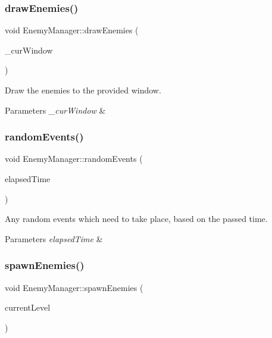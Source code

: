 \subsubsection{\texorpdfstring{draw\+Enemies()}{drawEnemies()}}
{\footnotesize\ttfamily void Enemy\+Manager\+::draw\+Enemies (\begin{DoxyParamCaption}\item[{sf\+::\+Render\+Window $\ast$}]{\+\_\+cur\+Window }\end{DoxyParamCaption})}



Draw the enemies to the provided window. 


\begin{DoxyParams}{Parameters}
{\em \+\_\+cur\+Window} & \\
\hline
\end{DoxyParams}
\mbox{\label{class_enemy_manager_abafa080764d42fbc020c33e48c7afb2f}} 
\subsubsection{\texorpdfstring{random\+Events()}{randomEvents()}}
{\footnotesize\ttfamily void Enemy\+Manager\+::random\+Events (\begin{DoxyParamCaption}\item[{const float \&}]{elapsed\+Time }\end{DoxyParamCaption})}



Any random events which need to take place, based on the passed time. 


\begin{DoxyParams}{Parameters}
{\em elapsed\+Time} & \\
\hline
\end{DoxyParams}
\mbox{\label{class_enemy_manager_a37036db8aad73493103815dc45c6339d}} 
\subsubsection{\texorpdfstring{spawn\+Enemies()}{spawnEnemies()}}
{\footnotesize\ttfamily void Enemy\+Manager\+::spawn\+Enemies (\begin{DoxyParamCaption}\item[{int \&}]{current\+Level }\end{DoxyParamCaption})}



